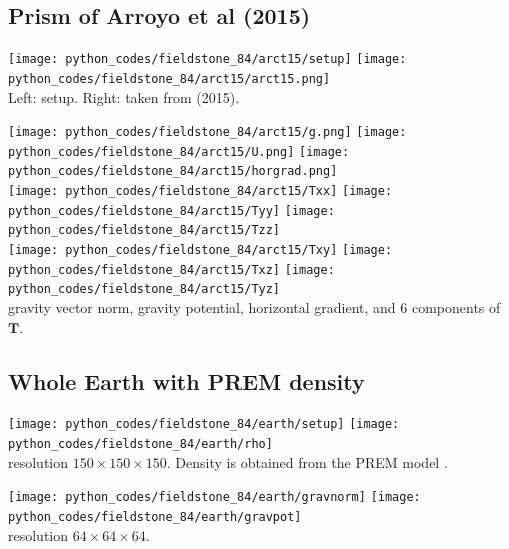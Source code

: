 \subsection*{Prism of Arroyo et al (2015)}

\begin{center}
\texttt{[image: python\_codes/fieldstone\_84/arct15/setup]}
\texttt{[image: python\_codes/fieldstone\_84/arct15/arct15.png]}\\
{\captionfont Left: setup. Right: taken from \textcite{arct15} (2015).}
\end{center}


\begin{center}
\texttt{[image: python\_codes/fieldstone\_84/arct15/g.png]}
\texttt{[image: python\_codes/fieldstone\_84/arct15/U.png]}
\texttt{[image: python\_codes/fieldstone\_84/arct15/horgrad.png]}\\
\texttt{[image: python\_codes/fieldstone\_84/arct15/Txx]}
\texttt{[image: python\_codes/fieldstone\_84/arct15/Tyy]}
\texttt{[image: python\_codes/fieldstone\_84/arct15/Tzz]}\\
\texttt{[image: python\_codes/fieldstone\_84/arct15/Txy]}
\texttt{[image: python\_codes/fieldstone\_84/arct15/Txz]}
\texttt{[image: python\_codes/fieldstone\_84/arct15/Tyz]}\\
{\captionfont gravity vector norm, gravity potential, horizontal gradient,
and 6 components of ${\bm T}$.}
\end{center}


\subsection*{Whole Earth with PREM density}


\begin{center}
\texttt{[image: python\_codes/fieldstone\_84/earth/setup]}
\texttt{[image: python\_codes/fieldstone\_84/earth/rho]}\\
{\captionfont resolution $150\times 150 \times 150$. Density is obtained from the PREM model \cite{dzan81}.}
\end{center}


\begin{center}
\texttt{[image: python\_codes/fieldstone\_84/earth/gravnorm]}
\texttt{[image: python\_codes/fieldstone\_84/earth/gravpot]}\\
{\captionfont resolution $64 \times 64 \times 64$.}
\end{center}

